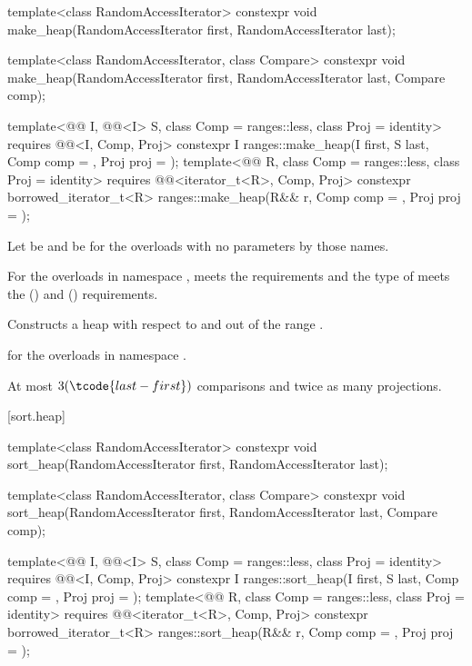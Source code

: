 %
\begin{itemdecl}
template<class RandomAccessIterator>
  constexpr void make_heap(RandomAccessIterator first, RandomAccessIterator last);

template<class RandomAccessIterator, class Compare>
  constexpr void make_heap(RandomAccessIterator first, RandomAccessIterator last,
                           Compare comp);

template<@@ I, @@<I> S, class Comp = ranges::less,
         class Proj = identity>
  requires @@<I, Comp, Proj>
  constexpr I
    ranges::make_heap(I first, S last, Comp comp = {}, Proj proj = {});
template<@@ R, class Comp = ranges::less, class Proj = identity>
  requires @@<iterator_t<R>, Comp, Proj>
  constexpr borrowed_iterator_t<R>
    ranges::make_heap(R&& r, Comp comp = {}, Proj proj = {});
\end{itemdecl}

\begin{itemdescr}
\pnum
Let  be 
and  be 
for the overloads with no parameters by those names.

\pnum
\expects
For the overloads in namespace ,
 meets
the  requirements and
the type of  meets
the  () and
 () requirements.

\pnum
\effects
Constructs a heap with respect to  and 
out of the range .

\pnum
\returns
{} for the overloads in namespace .

\pnum
\complexity
At most $3(\tcode{last - first})$ comparisons and twice as many projections.
\end{itemdescr}

[sort.heap]{}

%
\begin{itemdecl}
template<class RandomAccessIterator>
  constexpr void sort_heap(RandomAccessIterator first, RandomAccessIterator last);

template<class RandomAccessIterator, class Compare>
  constexpr void sort_heap(RandomAccessIterator first, RandomAccessIterator last,
                           Compare comp);

template<@@ I, @@<I> S, class Comp = ranges::less,
         class Proj = identity>
  requires @@<I, Comp, Proj>
  constexpr I
    ranges::sort_heap(I first, S last, Comp comp = {}, Proj proj = {});
template<@@ R, class Comp = ranges::less, class Proj = identity>
  requires @@<iterator_t<R>, Comp, Proj>
  constexpr borrowed_iterator_t<R>
    ranges::sort_heap(R&& r, Comp comp = {}, Proj proj = {});
\end{itemdecl}


